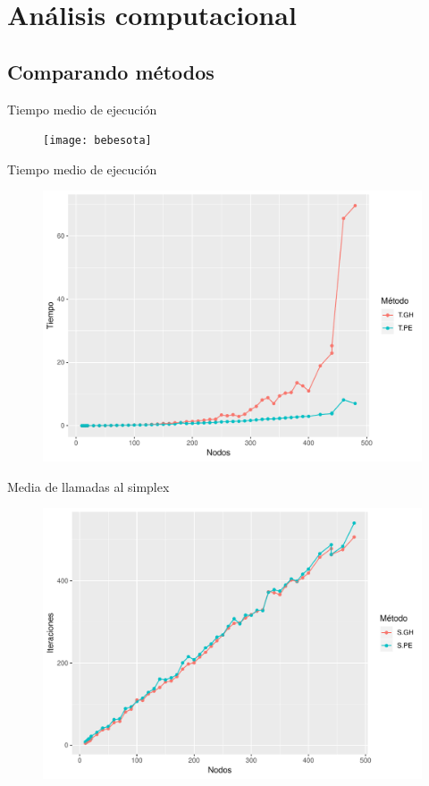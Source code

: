 \documentclass{beamer}
\begin{document}
\section{Análisis computacional}
\subsection{Comparando métodos}
\begin{frame}{Tiempo medio de ejecución}
\begin{figure}[h!]
\centering
\texttt{[image: bebesota]}
\end{figure}
\end{frame}

\begin{frame}{Tiempo medio de ejecución}
\begin{figure}[h!]
\centering
\includegraphics[scale=0.45]{plot3}
\end{figure}
\end{frame}

\begin{frame}{Media de llamadas al simplex}
\begin{figure}[h!]
\centering
\includegraphics[scale=0.45]{plot2}
\end{figure}
\end{frame}
\end{document}

